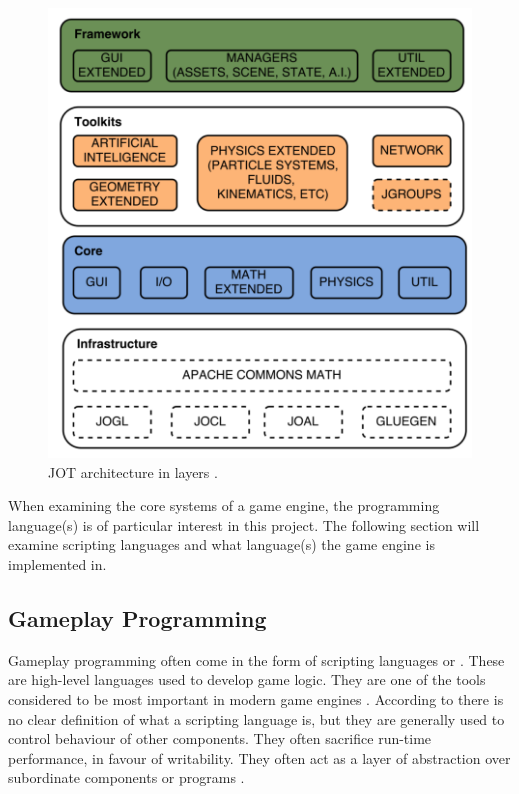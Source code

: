 \begin{figure}[H]
    \centering
    \includegraphics[scale = 0.6]{images/Game-development/Jot-layers.png}
    \caption{JOT architecture in layers \cite{amador2014jot}.}
    \label{fig:Jot_layers}
\end{figure}

When examining the core systems of a game engine, the programming language(s) is of particular interest in this project. The following section will examine scripting languages and what language(s) the game engine is implemented in.

\subsection{Gameplay Programming} \label{sec:gameplay:programming}
Gameplay programming often come in the form of scripting languages or . These are high-level languages used to develop game logic. They are one of the tools considered to be most important in modern game engines \cite{gamasutra:EngineSurvey, 5962102}. According to \cite{5962102} there is no clear definition of what a scripting language is, but they are generally used to control behaviour of other components. They often sacrifice run-time performance, in favour of writability. They often act as a layer of abstraction over subordinate components or programs \cite{5962102}.

